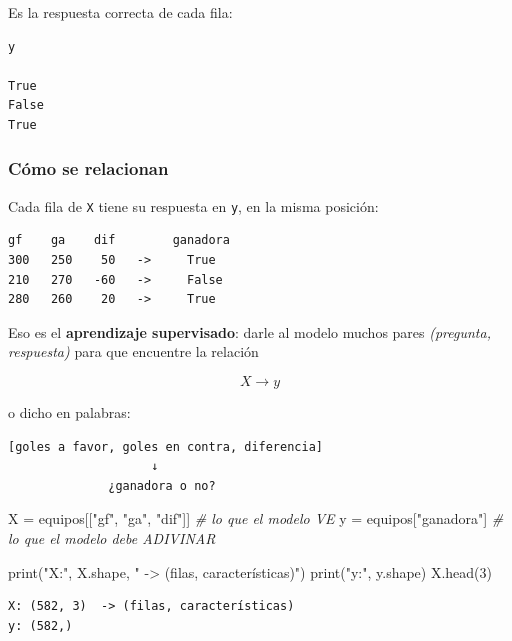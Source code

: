 \documentclass[
]{article}
\newenvironment{Shaded}{}{}
\newcommand{\BuiltInTok}[1]{\textcolor[rgb]{0.00,0.50,0.00}{#1}}
\newcommand{\CommentTok}[1]{\textcolor[rgb]{0.38,0.63,0.69}{\textit{#1}}}
\newcommand{\DecValTok}[1]{\textcolor[rgb]{0.25,0.63,0.44}{#1}}
\newcommand{\NormalTok}[1]{#1}
\newcommand{\OperatorTok}[1]{\textcolor[rgb]{0.40,0.40,0.40}{#1}}
\newcommand{\StringTok}[1]{\textcolor[rgb]{0.25,0.44,0.63}{#1}}
\begin{document}
Es la respuesta correcta de cada fila:

\begin{verbatim}
y

True
False
True
\end{verbatim}

\subsubsection{Cómo se relacionan}\label{cuxf3mo-se-relacionan}

Cada fila de \texttt{X} tiene su respuesta en \texttt{y}, en la misma
posición:

\begin{verbatim}
gf    ga    dif        ganadora
300   250    50   ->     True
210   270   -60   ->     False
280   260    20   ->     True
\end{verbatim}

Eso es el \textbf{aprendizaje supervisado}: darle al modelo muchos pares
\emph{(pregunta, respuesta)} para que encuentre la relación

\[X \longrightarrow y\]

o dicho en palabras:

\begin{verbatim}
[goles a favor, goles en contra, diferencia]
                    ↓
              ¿ganadora o no?
\end{verbatim}

\protect{}\label{nVa_K6jXnYyQ}
\begin{Shaded}
\begin{Highlighting}[]
\NormalTok{X }\OperatorTok{=}\NormalTok{ equipos[[}\StringTok{"gf"}\NormalTok{, }\StringTok{"ga"}\NormalTok{, }\StringTok{"dif"}\NormalTok{]]    }\CommentTok{\# lo que el modelo VE}
\NormalTok{y }\OperatorTok{=}\NormalTok{ equipos[}\StringTok{"ganadora"}\NormalTok{]             }\CommentTok{\# lo que el modelo debe ADIVINAR}

\BuiltInTok{print}\NormalTok{(}\StringTok{"X:"}\NormalTok{, X.shape, }\StringTok{" {-}\textgreater{} (filas, características)"}\NormalTok{)}
\BuiltInTok{print}\NormalTok{(}\StringTok{"y:"}\NormalTok{, y.shape)}
\NormalTok{X.head(}\DecValTok{3}\NormalTok{)}
\end{Highlighting}
\end{Shaded}

\begin{verbatim}
X: (582, 3)  -> (filas, características)
y: (582,)
\end{verbatim}
\end{document}
